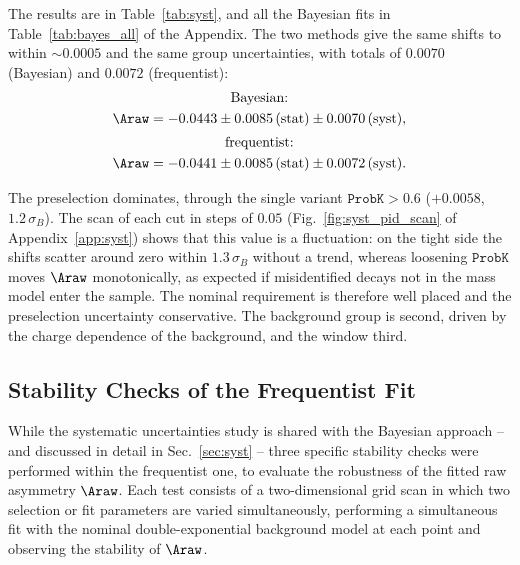 The results are in Table~\ref{tab:syst}, and all the Bayesian fits in Table~\ref{tab:bayes_all} of the Appendix. The two methods give the same shifts to within $\sim$$0.0005$ and the same group uncertainties, with totals of $0.0070$ (Bayesian) and $0.0072$ (frequentist):
\begin{gather*}
\text{Bayesian:}\\ \Araw=-0.0443\pm0.0085\,(\text{stat})\pm0.0070\,(\text{syst}),\\[2pt]
\text{frequentist:}\\ \Araw=-0.0441\pm0.0085\,(\text{stat})\pm0.0072\,(\text{syst}).
\end{gather*}

The preselection dominates, through the single variant $\texttt{ProbK}>0.6$ ($+0.0058$, $1.2\,\sigma_B$). The scan of each cut in steps of $0.05$ (Fig.~\ref{fig:syst_pid_scan} of Appendix~\ref{app:syst}) shows that this value is a fluctuation: on the tight side the shifts scatter around zero within $1.3\,\sigma_B$ without a trend, whereas loosening $\texttt{ProbK}$ moves $\Araw$ monotonically, as expected if misidentified decays not in the mass model enter the sample. The nominal requirement is therefore well placed and the preselection uncertainty conservative. The background group is second, driven by the charge dependence of the background, and the window third.

\subsection{Stability Checks of the Frequentist Fit}
\label{sec:freq_syst}
While the systematic uncertainties study is shared with the Bayesian approach -- and discussed in detail in Sec.~\ref{sec:syst} -- three specific stability checks were performed within the frequentist one, to evaluate the robustness of the fitted raw asymmetry $\Araw$. Each test consists of a two-dimensional grid scan in which two selection or fit parameters are varied simultaneously, performing a simultaneous fit with the nominal double-exponential background model at each point and observing the stability of $\Araw$.

